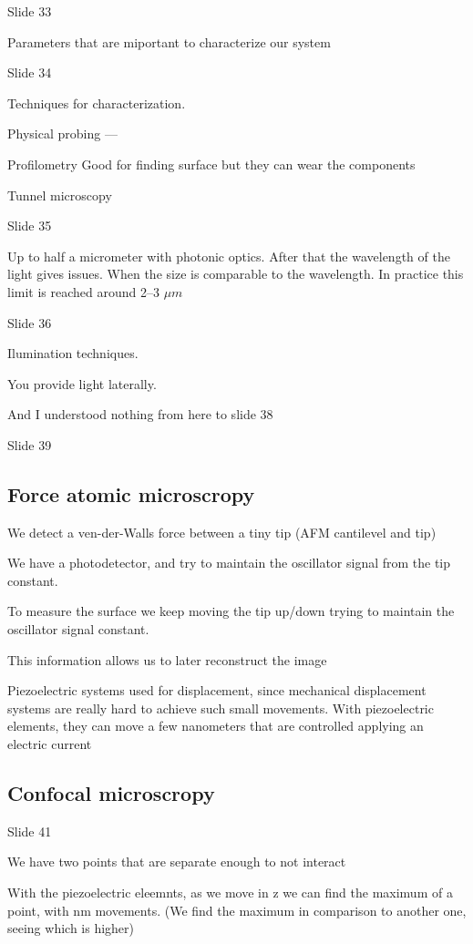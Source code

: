 \documentclass[../main/main.tex]{subfiles}
\begin{document}
Slide 33

Parameters that are miportant to characterize our system

Slide 34

Techniques for characterization.

Physical probing ---

Profilometry Good for finding surface but they can wear the components

Tunnel microscopy

Slide 35

Up to half a micrometer with photonic optics. After that the wavelength of the light gives issues. When the size is comparable to the wavelength. In practice this limit is reached around 2--3 $\mu m$


Slide 36

Ilumination techniques.

You provide light laterally.

And I understood nothing from here to slide 38


Slide 39

\subsection{Force atomic microscropy}

We detect a ven-der-Walls force between a tiny tip (AFM cantilevel and tip)

We have a photodetector, and try to maintain the oscillator signal from the tip constant.

To measure the surface we keep moving the tip up/down trying to maintain the oscillator signal constant.

This information allows us to later reconstruct the image

Piezoelectric systems used for displacement, since mechanical displacement systems are really hard to achieve such small movements. With piezoelectric elements, they can move a few nanometers that are controlled applying an electric current


\subsection{Confocal microscropy}

Slide 41

We have two points that are separate enough to not interact

With the piezoelectric eleemnts, as we move in z we can find the maximum of a point, with nm movements. (We find the maximum in comparison to another one, seeing which is higher)
\end{document}

